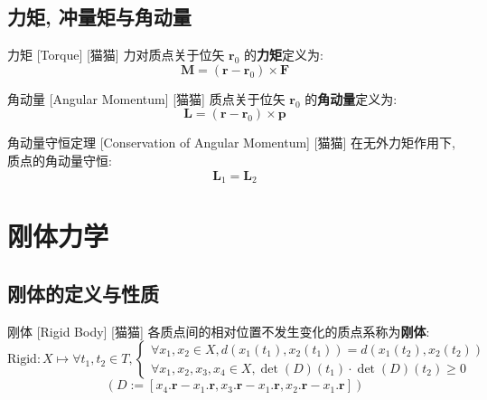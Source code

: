 \documentclass[UTF8]{ctexart}
\begin{document}
    \subsection{力矩, 冲量矩与角动量}
        
        \begin{dfn}
            []
            {力矩}
            [Torque]
            [猫猫]
            力对质点关于位矢 \(\bm{r}_0\) 的\textbf{力矩}定义为: 
            \[\bm{M}=(\bm{r}-\bm{r}_0)\times\bm{F}\]
        \end{dfn}
        
        \begin{dfn}
            []
            {角动量}
            [Angular Momentum]
            [猫猫]
            质点关于位矢 \(\bm{r}_0\) 的\textbf{角动量}定义为: 
            \[\bm{L}=(\bm{r}-\bm{r}_0)\times\bm{p}\]
        \end{dfn}
        
        \begin{thm}
            []
            {角动量守恒定理}
            [Conservation of Angular Momentum]
            [猫猫]
            在无外力矩作用下, 质点的角动量守恒: 
            \[\bm{L}_1=\bm{L}_2\]
        \end{thm}

\section{刚体力学}
    
        \subsection{刚体的定义与性质}
            
            \begin{dfn}
                []
                {刚体}
                [Rigid Body]
                [猫猫]
                各质点间的相对位置不发生变化的质点系称为\textbf{刚体}: 
                \[\text{Rigid}:X\mapsto\forall t_1, t_2\in T, 
                \begin{cases}
                    \forall x_1,x_2\in X, d(x_1(t_1),x_2(t_1))=d(x_1(t_2), x_2(t_2))\\
                    \forall x_1,x_2,x_3,x_4\in X, \det(D)(t_1)\cdot\det(D)(t_2)\geq 0
                \end{cases}\]
                \[(D:=[x_4.\bm{r}-x_1.\bm{r}, x_3.\bm{r}-x_1.\bm{r}, x_2.\bm{r}-x_1.\bm{r}])\] 
            \end{dfn}
            
\end{document}
